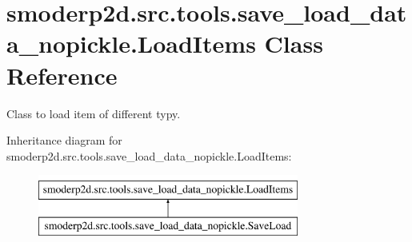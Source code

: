 \hypertarget{classsmoderp2d_1_1src_1_1tools_1_1save__load__data__nopickle_1_1LoadItems}{\section{smoderp2d.\-src.\-tools.\-save\-\_\-load\-\_\-data\-\_\-nopickle.\-Load\-Items Class Reference}
\label{classsmoderp2d_1_1src_1_1tools_1_1save__load__data__nopickle_1_1LoadItems}
}


Class to load item of different typy.  


Inheritance diagram for smoderp2d.\-src.\-tools.\-save\-\_\-load\-\_\-data\-\_\-nopickle.\-Load\-Items\-:\begin{figure}[H]
\begin{center}
\leavevmode
\includegraphics[height=2.000000cm]{classsmoderp2d_1_1src_1_1tools_1_1save__load__data__nopickle_1_1LoadItems}
\end{center}
\end{figure}
